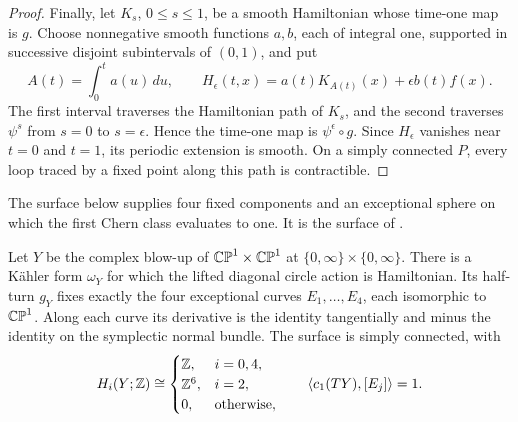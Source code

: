 \begin{proof}
Finally, let $K_s$, $0\leq s\leq1$, be a smooth Hamiltonian whose
time-one map is $g$. Choose nonnegative smooth functions $a,b$, each
of integral one, supported in successive disjoint subintervals of
$(0,1)$, and put
\[
  A(t)=\int_0^t a(u)\,du,\qquad
  H_\epsilon(t,x)=a(t)K_{A(t)}(x)+\epsilon b(t)f(x).
\]
The first interval traverses the Hamiltonian path of $K_s$, and the
second traverses $\psi^s$ from $s=0$ to $s=\epsilon$. Hence the time-one
map is $\psi^\epsilon\circ g$. Since $H_\epsilon$ vanishes near $t=0$
and $t=1$, its periodic extension is smooth. On a simply connected $P$,
every loop traced by a fixed point along this path is contractible.
\end{proof}

The surface below supplies four fixed components and an exceptional
sphere on which the first Chern class evaluates to one. It is the
surface of \cite[Proposition~4.3]{OpenAI2026Stable}.

\begin{proposition}\label{inv:surface}
Let $Y$ be the complex blow-up of $\mathbb {CP}^1\times\mathbb {CP}^1$ at
$\{0,\infty\}\times\{0,\infty\}$. There is a K\"ahler form
$\omega_Y$ for which the lifted diagonal circle action is Hamiltonian.
Its half-turn $g_Y$ fixes exactly the four exceptional curves
$E_1,\ldots,E_4$, each isomorphic to $\mathbb {CP}^1$. Along each curve its
derivative is the identity tangentially and minus the identity on the
symplectic normal bundle. The surface is simply connected, with
\[
  H_i(Y;\mathbb Z)\cong
  \begin{cases}
    \mathbb Z,&i=0,4,\\
    \mathbb Z^6,&i=2,\\
    0,&\text{otherwise},
  \end{cases}
  \qquad
  \langle c_1(TY),[E_j]\rangle=1.
\]
\end{proposition}

